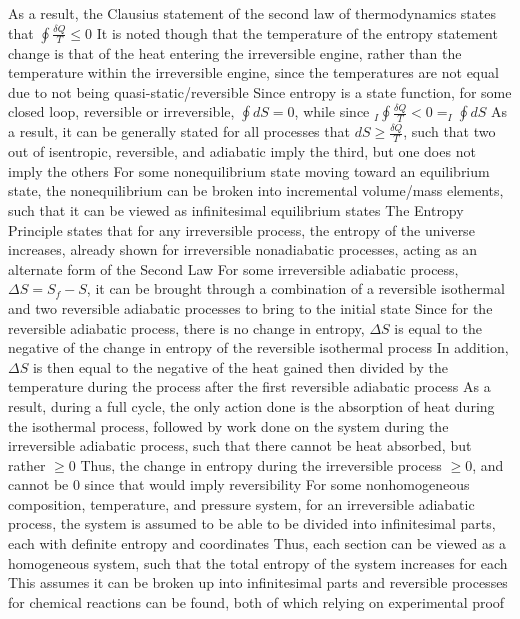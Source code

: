 \documentclass[11 pt, twoside]{article}
\newenvironment{outline*}
{
	\begin{outline}[enumerate]
	}
	{\end{outline}
}
\begin{document}
\begin{outline*}
\2 As a result, the Clausius statement of the second law of thermodynamics states that $\oint \frac{\delta Q}{T} \leq 0$
\3 It is noted though that the temperature of the entropy statement change is that of the heat entering the irreversible engine, rather than the temperature within the irreversible engine, since the temperatures are not equal due to not being quasi-static/reversible
\1 Since entropy is a state function, for some closed loop, reversible or irreversible, $\oint dS = 0$, while since $_I\oint \frac{\delta Q}{T} < 0 = _I\oint dS$
\2 As a result, it can be generally stated for all processes that $dS \geq \frac{\delta Q}{T}$, such that two out of isentropic, reversible, and adiabatic imply the third, but one does not imply the others
\1 For some nonequilibrium state moving toward an equilibrium state, the nonequilibrium can be broken into incremental volume/mass elements, such that it can be viewed as infinitesimal equilibrium states 
\1 The Entropy Principle states that for any irreversible process, the entropy of the universe increases, already shown for irreversible nonadiabatic processes, acting as an alternate form of the Second Law
\2 For some irreversible adiabatic process, $\Delta S = S_f - S$, it can be brought through a combination of a reversible isothermal and two reversible adiabatic processes to bring to the initial state
\3 Since for the reversible adiabatic process, there is no change in entropy, $\Delta S$ is equal to the negative of the change in entropy of the reversible isothermal process
\3 In addition, $\Delta S$ is then equal to the negative of the heat gained then divided by the temperature during the process after the first reversible adiabatic process
\3 As a result, during a full cycle, the only action done is the absorption of heat during the isothermal process, followed by work done on the system during the irreversible adiabatic process, such that there cannot be heat absorbed, but rather $\geq 0$
\3 Thus, the change in entropy during the irreversible process $\geq 0$, and cannot be 0 since that would imply reversibility
\2 For some nonhomogeneous composition, temperature, and pressure system, for an irreversible adiabatic process, the system is assumed to be able to be divided into infinitesimal parts, each with definite entropy and coordinates
\3 Thus, each section can be viewed as a homogeneous system, such that the total entropy of the system increases for each
\3 This assumes it can be broken up into infinitesimal parts and reversible processes for chemical reactions can be found, both of which relying on experimental proof

\end{outline*}
\end{document}
